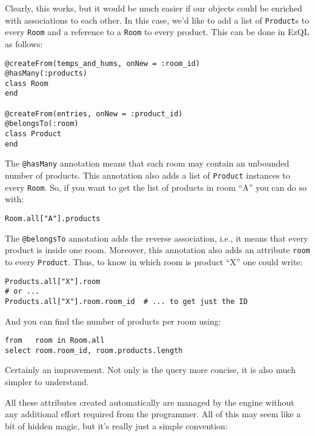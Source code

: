 \documentclass{report}
\begin{document}
Clearly, this works, but it would be much easier if our objects could
be enriched with associations to each other. In this case, we'd like
to add a list of \verb=Product=s to every \verb=Room= and a reference
to a \verb=Room= to every product. This can be done in EzQL as
follows:

\begin{verbatim}
@createFrom(temps_and_hums, onNew = :room_id)
@hasMany(:products)
class Room
end

@createFrom(entries, onNew = :product_id)
@belongsTo(:room)
class Product
end
\end{verbatim}

The \verb=@hasMany= annotation means that each room may contain an
unbounded number of products. This annotation also adds a list of
\verb=Product= instances to every \verb=Room=. So, if you want to get
the list of products in room ``A'' you can do so with:

\begin{verbatim}
Room.all["A"].products
\end{verbatim}

The \verb=@belongsTo= annotation adds the reverse association, i.e.,
it means that every product is inside one room. Moreover, this
annotation also adds an attribute \verb=room= to every
\verb=Product=. Thus, to know in which room is product ``X'' one could
write:

\begin{verbatim}
Products.all["X"].room
# or ...
Products.all["X"].room.room_id  # ... to get just the ID
\end{verbatim}

And you can find the number of products per room using:

\begin{verbatim}
from   room in Room.all
select room.room_id, room.products.length
\end{verbatim}

Certainly an improvement. Not only is the query more concise, it is
also much simpler to understand.

All these attributes created automatically are managed by the engine
without any additional effort required from the programmer. All of
this may seem like a bit of hidden magic, but it's really just a
simple convention:
\end{document}
